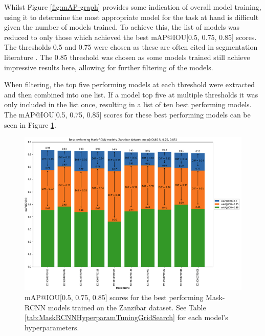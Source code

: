 Whilst Figure \ref{fig:mAP-graph} provides some indication of overall model training, using it to determine the most appropriate model for the task at hand is difficult given the number of models trained. To achieve this, the list of models was reduced to only those which achieved the best mAP@IOU[0.5, 0.75, 0.85] scores. The thresholds 0.5 and 0.75 were chosen as these are often cited in segmentation literature \cite{bolya_190402689_2019, wang_solov2_2020, tian_fcos_2019}. The 0.85 threshold was chosen as some models trained still achieve impressive results here, allowing for further filtering of the models. 

When filtering, the top five performing models at each threshold were extracted and then combined into one list. If a model top five at multiple thresholds it was only included in the list once, resulting in a list of ten best performing models. The mAP@IOU[0.5, 0.75, 0.85] scores for these best performing models can be seen in Figure \ref{fig:mAP-best-models-bar-chart}.

\begin{figure}[h]
	\begin{center}
		\includegraphics[scale=0.6]{Chapter3/figs/mask-RCNN-model-bar-chart.png}
	\end{center}
	\caption{mAP@IOU[0.5, 0.75, 0.85] scores for the best performing Mask-RCNN models trained on the Zanzibar dataset. See Table \ref{tab:MaskRCNNHyperparamTuningGridSearch} for each model's hyperparameters.}
	\label{fig:mAP-best-models-bar-chart}
\end{figure}

